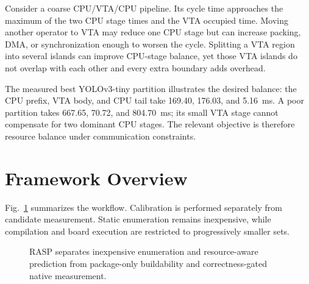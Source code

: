 \documentclass[conference]{IEEEtran}
\newcommand{\framework}{RASP}
\begin{document}
Consider a coarse CPU/VTA/CPU pipeline. Its cycle time approaches the maximum of the two CPU stage times and the VTA occupied time. Moving another operator to VTA may reduce one CPU stage but can increase packing, DMA, or synchronization enough to worsen the cycle. Splitting a VTA region into several islands can improve CPU-stage balance, yet those VTA islands do not overlap with each other and every extra boundary adds overhead.

The measured best YOLOv3-tiny partition illustrates the desired balance: the CPU prefix, VTA body, and CPU tail take 169.40, 176.03, and 5.16~ms. A poor partition takes 667.65, 70.72, and 804.70~ms; its small VTA stage cannot compensate for two dominant CPU stages. The relevant objective is therefore resource balance under communication constraints.

\section{Framework Overview}

Fig.~\ref{fig:workflow} summarizes the workflow. Calibration is performed separately from candidate measurement. Static enumeration remains inexpensive, while compilation and board execution are restricted to progressively smaller sets.

\begin{figure}[t]
\centering
{}
\caption{\framework{} separates inexpensive enumeration and resource-aware prediction from package-only buildability and correctness-gated native measurement.}
\label{fig:workflow}
\end{figure}
\end{document}

